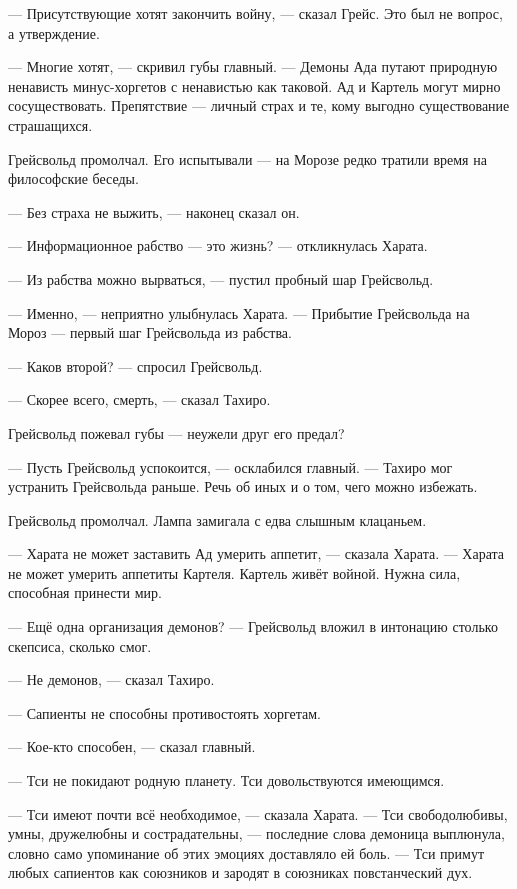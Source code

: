 --- Присутствующие хотят закончить войну, --- сказал Грейс.
Это был не вопрос, а утверждение.

--- Многие хотят, --- скривил губы главный.
--- Демоны Ада путают природную ненависть минус-хоргетов с ненавистью как таковой.
Ад и Картель могут мирно сосуществовать.
Препятствие --- личный страх и те, кому выгодно существование страшащихся.

Грейсвольд промолчал.
Его испытывали --- на Морозе редко тратили время на философские беседы.

--- Без страха не выжить, --- наконец сказал он.

--- Информационное рабство --- это жизнь? --- откликнулась Харата.

--- Из рабства можно вырваться, --- пустил пробный шар Грейсвольд.

--- Именно, --- неприятно улыбнулась Харата.
--- Прибытие Грейсвольда на Мороз --- первый шаг Грейсвольда из рабства.

--- Каков второй? --- спросил Грейсвольд.

--- Скорее всего, смерть, --- сказал Тахиро.

Грейсвольд пожевал губы --- неужели друг его предал?

--- Пусть Грейсвольд успокоится, --- осклабился главный.
--- Тахиро мог устранить Грейсвольда раньше.
Речь об иных и о том, чего можно избежать.

Грейсвольд промолчал.
Лампа замигала с едва слышным клацаньем.

--- Харата не может заставить Ад умерить аппетит, --- сказала Харата.
--- Харата не может умерить аппетиты Картеля.
Картель живёт войной.
Нужна сила, способная принести мир.

--- Ещё одна организация демонов? --- Грейсвольд вложил в интонацию столько скепсиса, сколько смог.

--- Не демонов, --- сказал Тахиро.

--- Сапиенты не способны противостоять хоргетам.

--- Кое-кто способен, --- сказал главный.

--- Тси не покидают родную планету.
Тси довольствуются имеющимся.

--- Тси имеют почти всё необходимое, --- сказала Харата.
--- Тси свободолюбивы, умны, дружелюбны и сострадательны, --- последние слова демоница выплюнула, словно само упоминание об этих эмоциях доставляло ей боль.
--- Тси примут любых сапиентов как союзников и зародят в союзниках повстанческий дух.

